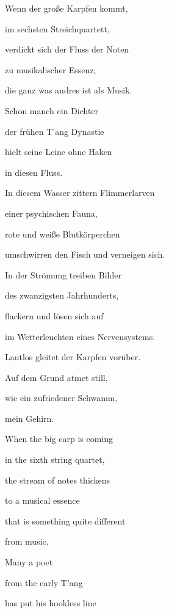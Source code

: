 \documentclass[a4paper]{article}
\begin{document}
Wenn der große Karpfen kommt,

im sechsten Streichquartett,

verdickt sich der Fluss der Noten

zu musikalischer Essenz,


\bigskip

die ganz was andres ist als Musik. 


\bigskip

Schon manch ein Dichter

der frühen T’ang Dynastie

hielt seine Leine ohne Haken

in diesen Fluss.


\bigskip

In diesem Wasser zittern Flimmerlarven

einer psychischen Fauna,

rote und weiße Blutkörperchen

umschwirren den Fisch und verneigen sich.


\bigskip

In der Strömung treiben Bilder

des zwanzigsten Jahrhunderts,

flackern und lösen sich auf

im Wetterleuchten eines Nervensystems.


\bigskip

Lautlos gleitet der Karpfen vorüber.

Auf dem Grund atmet still,

wie ein zufriedener Schwamm, 

mein Gehirn.


\bigskip



\bigskip

When the big carp is coming

in the sixth string quartet,

the stream of notes thickens

to a musical essence


\bigskip

that is something quite different

from music. 


\bigskip

Many a poet

from the early T’ang 

has put his hookless line
\end{document}
